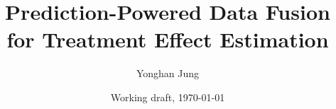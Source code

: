 \documentclass[letterpaper,11pt]{scrartcl}
\title{\textbf{Prediction-Powered Data Fusion for Treatment Effect Estimation}}
\author{Yonghan Jung}
\date{Working draft, \today}
\begin{document}
\maketitle
\allowdisplaybreaks

\begin{abstract}

\end{abstract}

\tableofcontents
\newpage

\begingroup
\allowdisplaybreaks
\sloppy





\endgroup

\clearpage




\begingroup
\allowdisplaybreaks
\sloppy

\clearpage

\clearpage

\clearpage

\endgroup
\end{document}
